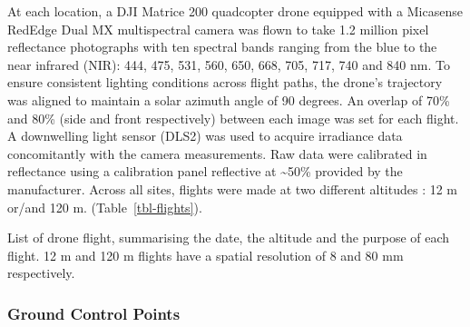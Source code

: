 \documentclass[
  number]{elsarticle}
\begin{document}
At each location, a DJI Matrice 200 quadcopter drone equipped with a
Micasense RedEdge Dual MX multispectral camera was flown to take 1.2
million pixel reflectance photographs with ten spectral bands ranging
from the blue to the near infrared (NIR): 444, 475, 531, 560, 650, 668,
705, 717, 740 and 840 nm. To ensure consistent lighting conditions
across flight paths, the drone's trajectory was aligned to maintain a
solar azimuth angle of 90 degrees. An overlap of 70\% and 80\% (side and
front respectively) between each image was set for each flight. A
downwelling light sensor (DLS2) was used to acquire irradiance data
concomitantly with the camera measurements. Raw data were calibrated in
reflectance using a calibration panel reflective at \textasciitilde50\%
provided by the manufacturer. Across all sites, flights were made at two
different altitudes : 12 m or/and 120 m. (Table~\ref{tbl-flights}).

\begin{table}

\caption{\label{tbl-flights}List of drone flight, summarising the date,
the altitude and the purpose of each flight. 12 m and 120 m flights have
a spatial resolution of 8 and 80 mm respectively.}


\end{table}%

\subsubsection{Ground Control Points}\label{ground-control-points}
\end{document}
